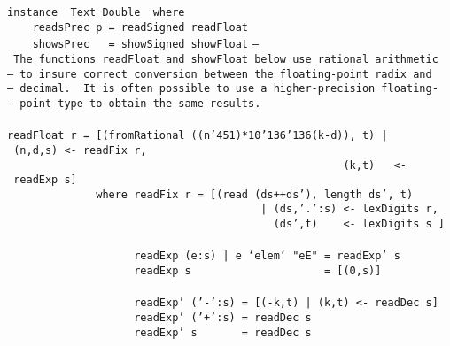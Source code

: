 %
\eprogB\noindent\bprogB
\mbox{\tt instance\ \ Text\ Double\ \ where}\\
\mbox{\tt \ \ \ \ readsPrec\ p\ =\ readSigned\ readFloat}\\
\mbox{\tt \ \ \ \ showsPrec\ \ \ =\ showSigned\ showFloat}
%
\eprogB\noindent\bprogB
\mbox{\tt --\ The\ functions\ readFloat\ and\ showFloat\ below\ use\ rational\ arithmetic}\\
\mbox{\tt --\ to\ insure\ correct\ conversion\ between\ the\ floating-point\ radix\ and}\\
\mbox{\tt --\ decimal.\ \ It\ is\ often\ possible\ to\ use\ a\ higher-precision\ floating-}\\
\mbox{\tt --\ point\ type\ to\ obtain\ the\ same\ results.}\\
\mbox{\tt }\\[-8pt]
\mbox{\tt readFloat\ r\ =\ [(fromRational\ ((n{\char'45}1)*10{\char'136}{\char'136}(k-d)),\ t)\ |\ (n,d,s)\ <-\ readFix\ r,}\\
\mbox{\tt \ \ \ \ \ \ \ \ \ \ \ \ \ \ \ \ \ \ \ \ \ \ \ \ \ \ \ \ \ \ \ \ \ \ \ \ \ \ \ \ \ \ \ \ \ \ \ \ \ \ \ \ \ (k,t)\ \ \ <-\ readExp\ s]}\\
\mbox{\tt \ \ \ \ \ \ \ \ \ \ \ \ \ \ where\ readFix\ r\ =\ [(read\ (ds++ds'),\ length\ ds',\ t)}\\
\mbox{\tt \ \ \ \ \ \ \ \ \ \ \ \ \ \ \ \ \ \ \ \ \ \ \ \ \ \ \ \ \ \ \ \ \ \ \ \ \ \ \ \ |\ (ds,'.':s)\ <-\ lexDigits\ r,}\\
\mbox{\tt \ \ \ \ \ \ \ \ \ \ \ \ \ \ \ \ \ \ \ \ \ \ \ \ \ \ \ \ \ \ \ \ \ \ \ \ \ \ \ \ \ \ (ds',t)\ \ \ \ <-\ lexDigits\ s\ ]}\\
\mbox{\tt }\\[-8pt]
\mbox{\tt \ \ \ \ \ \ \ \ \ \ \ \ \ \ \ \ \ \ \ \ readExp\ (e:s)\ |\ e\ `elem`\ "eE"\ =\ readExp'\ s}\\
\mbox{\tt \ \ \ \ \ \ \ \ \ \ \ \ \ \ \ \ \ \ \ \ readExp\ s\ \ \ \ \ \ \ \ \ \ \ \ \ \ \ \ \ \ \ \ \ =\ [(0,s)]}\\
\mbox{\tt }\\[-8pt]
\mbox{\tt \ \ \ \ \ \ \ \ \ \ \ \ \ \ \ \ \ \ \ \ readExp'\ ('-':s)\ =\ [(-k,t)\ |\ (k,t)\ <-\ readDec\ s]}\\
\mbox{\tt \ \ \ \ \ \ \ \ \ \ \ \ \ \ \ \ \ \ \ \ readExp'\ ('+':s)\ =\ readDec\ s}\\
\mbox{\tt \ \ \ \ \ \ \ \ \ \ \ \ \ \ \ \ \ \ \ \ readExp'\ s\ \ \ \ \ \ \ =\ readDec\ s}
\eprogB\noindent\bprogB

